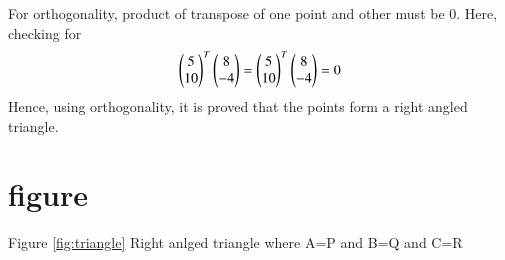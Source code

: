 \documentclass[journal,12pt,twocolumn]{IEEEtran}
\begin{document}
For orthogonality, product of transpose of one point and other must be 0. 
Here, checking for 
\begin{align}
    \begin{pmatrix}
5\\
10 
\end{pmatrix}^T\begin{pmatrix} 8\\
-4
\end{pmatrix} =  \begin{pmatrix}
5\\
10
\end{pmatrix}^T \begin{pmatrix}
8 \\ -4
\end{pmatrix}=0
\end{align}
Hence, using orthogonality, it is proved that the points form a right angled triangle. 

\section{figure}

Figure \ref{fig:triangle} Right anlged triangle where A=P and B=Q and C=R
\end{document}

